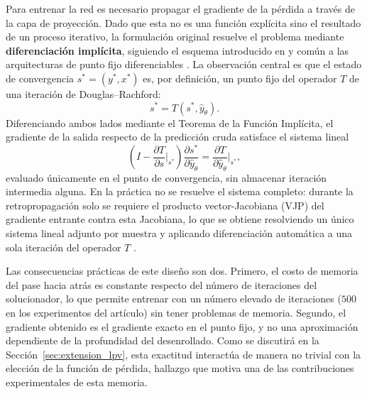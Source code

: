 Para entrenar la red es necesario propagar el gradiente de la pérdida a través de la 
capa de proyección. Dado que esta no es una función explícita sino el resultado de un 
proceso iterativo, la formulación original resuelve el problema mediante 
\textbf{diferenciación implícita}, siguiendo el esquema introducido en 
\cite{grontas2026pinet} y común a las arquitecturas de punto fijo diferenciables 
\cite{bai2019deq, gould2021ddn}. La observación central es que el estado de 
convergencia $s^* = (y^*, x^*)$ es, por definición, un punto fijo del operador $T$ de 
una iteración de Douglas--Rachford:
\begin{equation}
    s^* = T(s^*, \hat{y}_\theta).
    \label{eq:punto_fijo}
\end{equation}
Diferenciando ambos lados mediante el Teorema de la Función Implícita, el gradiente de 
la salida respecto de la predicción cruda satisface el sistema lineal
\begin{equation}
    \left(I - \frac{\partial T}{\partial s}\Big|_{s^*}\right) 
    \frac{\partial s^*}{\partial \hat{y}_\theta} 
    = \frac{\partial T}{\partial \hat{y}_\theta}\Big|_{s^*},
    \label{eq:diferenciacion_implicita}
\end{equation}
evaluado únicamente en el punto de convergencia, sin almacenar iteración intermedia 
alguna. En la práctica no se resuelve el sistema completo: durante la retropropagación 
solo se requiere el producto vector-Jacobiana (VJP) del gradiente entrante contra esta 
Jacobiana, lo que se obtiene resolviendo un único sistema lineal adjunto por muestra y 
aplicando diferenciación automática a una sola iteración del operador $T$ 
\cite{tang2026lminet, grontas2026pinet}.

Las consecuencias prácticas de este diseño son dos. Primero, el costo de memoria del 
pase hacia atrás es constante respecto del número de iteraciones del solucionador, lo 
que permite entrenar con un número elevado de iteraciones ($500$ en los experimentos 
del artículo) sin tener problemas de memoria. Segundo, el gradiente obtenido es el gradiente 
exacto en el punto fijo, y no una aproximación dependiente de la profundidad del 
desenrollado. Como se discutirá en la Sección~\ref{sec:extension_lpv}, esta exactitud 
interactúa de manera no trivial con la elección de la función de pérdida, hallazgo que 
motiva una de las contribuciones experimentales de esta memoria.





